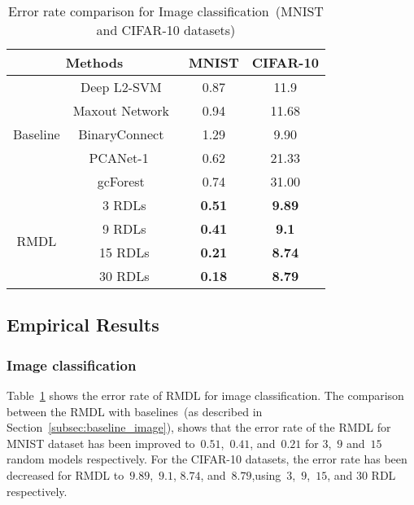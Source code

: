 \documentclass[sigconf, final]{acmart}
\begin{document}
\begin{table}[t]
\centering
\caption{Error rate comparison for Image classification~(MNIST and CIFAR-10 datasets)}
\label{ta:image}
\vspace{-0.1in}
\begin{tabular}{|c | c | c c|}
\hline
\multicolumn{2}{|c}{Methods}                                            & MNIST         & CIFAR-10     \\ \hline
\multirow{5}{*}{Baseline} & Deep L2-SVM~\cite{tang2013deep}                 & 0.87          & 11.9         \\ \cline{2-4} 
                          & Maxout Network~\cite{goodfellow2013maxout} & 0.94          & 11.68        \\ \cline{2-4} 
                          & BinaryConnect~\cite{courbariaux2015binaryconnect} & 1.29          & 9.90         \\ \cline{2-4} 
                          & PCANet-1 ~\cite{chan2015pcanet}                      & 0.62          & 21.33        \\ \cline{2-4} 
                          & gcForest~\cite{zhou2017deep}                    & 0.74          & 31.00        \\ \hline
\multirow{4}{*}{RMDL}     & 3 RDLs                              & \textbf{0.51}     & \textbf{9.89}    \\ \cline{2-4} 
                          & 9 RDLs                              & \textbf{0.41} & \textbf{9.1} \\ \cline{2-4} 
                          & 15 RDLs                             & \textbf{0.21} & \textbf{8.74}    \\ \cline{2-4}
                          \cline{2-4} 
                          & 30 RDLs                             & \textbf{0.18} & \textbf{8.79}    \\ \hline
\end{tabular}
\vspace{-0.1in}
\end{table}

\subsection{Empirical Results}\label{sec:Empirical_Results}
\subsubsection{Image classification}
Table~\ref{ta:image} shows the error rate of RMDL for image classification. The comparison between the RMDL with baselines~(as described in Section~\ref{subsec:baseline_image}), shows that the error rate of the RMDL for MNIST dataset has been improved to~$0.51$,~$0.41$, and~$0.21$ for $3$,~$9$ and~$15$ random models respectively. For the CIFAR-10 datasets, the error rate has been decreased for RMDL to~$9.89$,~$9.1$, $8.74$, and~$8.79$,using~$3$,~$9$,~$15$, and $30$ RDL respectively.
\end{document}
